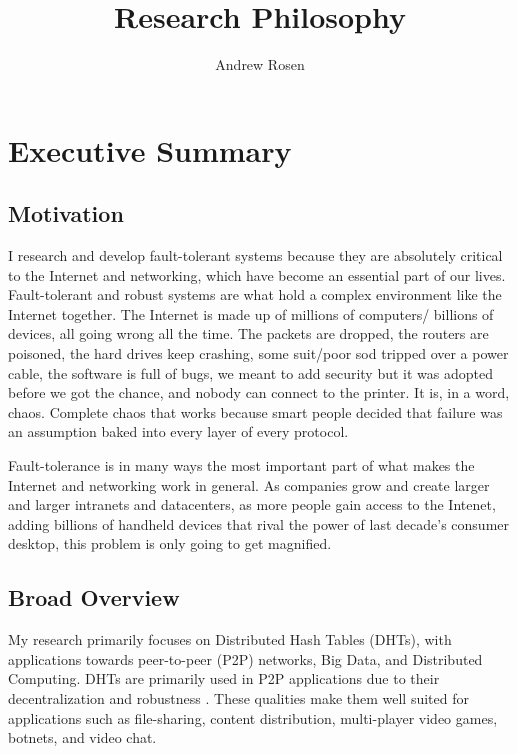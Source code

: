 \documentclass[10pt, a4paper]{article}
\author{Andrew Rosen}
\title{Research Philosophy}
\date{}
\begin{document}
\maketitle



\section{Executive Summary}




\subsection{Motivation}
I research and develop fault-tolerant systems because they are absolutely critical to the Internet and networking, which have become an essential part of our lives.
Fault-tolerant and robust systems are what hold a complex environment like the Internet together.
The Internet is made up of millions of computers/ billions of devices, all going wrong all the time.
The packets are dropped, the routers are poisoned, the hard drives keep crashing, some suit/poor sod tripped over a power cable, the software is full of bugs, we meant to add security but it was adopted before we got the chance, and nobody can connect to the printer.
It is, in a word, chaos.
Complete chaos that works because smart people decided that failure was an assumption baked into every layer of every protocol.

Fault-tolerance is in many ways the most important part of what makes the Internet and networking work in general.
As companies grow and create larger and larger intranets and datacenters, as more people gain access to the Intenet, adding billions of handheld devices that rival the power of last decade's consumer desktop, this problem is only going to get magnified.

\subsection{Broad Overview}

My research primarily focuses on Distributed Hash Tables (DHTs), with applications towards peer-to-peer (P2P) networks, Big Data, and Distributed Computing.
DHTs are primarily used in P2P applications due to their decentralization and robustness . 
These qualities make them well suited for applications such as file-sharing, content distribution, multi-player video games, botnets, and video chat.
\end{document}
